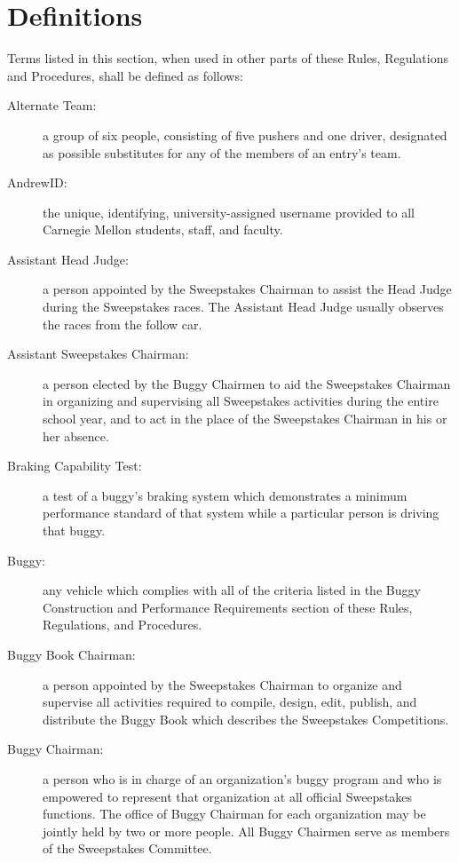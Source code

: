 \chapter{Definitions}

Terms listed in this section, when used in other parts of these Rules,
 Regulations and Procedures, shall be defined as follows:

\begin{description}

	\item[Alternate Team:]
	a group of six people, consisting of five pushers and one driver, designated as possible substitutes for any of the members of an entry's team.

	\item[AndrewID:]
	the unique, identifying, university-assigned username provided to all Carnegie Mellon students, staff, and faculty.

	\item[Assistant Head Judge:]
	a person appointed by the Sweepstakes Chairman to assist the Head Judge during the Sweepstakes races. The Assistant Head Judge usually observes the races from the follow car.

	\item[Assistant Sweepstakes Chairman:]
	a person elected by the Buggy Chairmen to aid the Sweepstakes Chairman in organizing and supervising all Sweepstakes activities during the entire school year, and to act in the place of the Sweepstakes Chairman in his or her absence.

	\item[Braking Capability Test:]
	a test of a buggy's braking system which demonstrates a minimum performance standard of that system while a particular person is driving that buggy.

	\item[Buggy:]
	any vehicle which complies with all of the criteria listed in the Buggy Construction and Performance Requirements section of these Rules, Regulations, and Procedures.

	\item[Buggy Book Chairman:]
	a person appointed by the Sweepstakes Chairman to organize and supervise all activities required to compile, design, edit, publish, and distribute the Buggy Book which describes the Sweepstakes Competitions.

	\item[Buggy Chairman:]
	a person who is in charge of an organization's buggy program and who is empowered to represent that organization at all official Sweepstakes functions. The office of Buggy Chairman for each organization may be jointly held by two or more people. All Buggy Chairmen serve as members of the Sweepstakes Committee.


\end{description}
